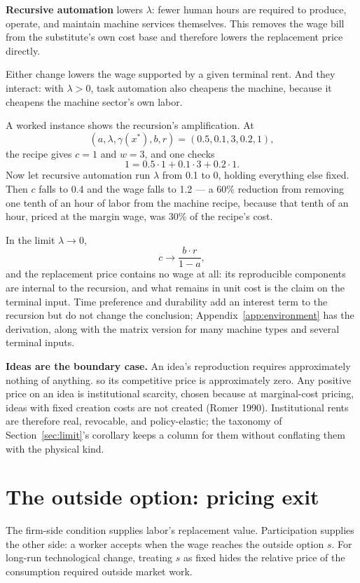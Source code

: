 \documentclass[12pt]{article}
\theoremstyle{plain}
\begin{document}
\textbf{Recursive automation} lowers $\lambda$: fewer human hours are required to
produce, operate, and maintain machine services themselves. This removes the wage
bill from the substitute's own cost base and therefore lowers the replacement
price directly. 

Either change lowers the wage supported by a given terminal rent. And they
interact: with $\lambda>0$, task automation also cheapens the machine, because it
cheapens the machine sector's own labor.

A worked instance shows the recursion's amplification. At
\[
(a,\lambda,\gamma(x^*),b,r)=(0.5,0.1,3,0.2,1),
\]
the recipe gives $c=1$ and $w=3$, and one checks
\[
1 = 0.5\cdot1 + 0.1\cdot3 + 0.2\cdot1.
\]
Now let recursive automation run $\lambda$ from 0.1 to 0, holding everything
else fixed. Then $c$ falls to 0.4 and the wage falls to 1.2 --- a 60\% reduction
from removing one tenth of an hour of labor from the machine recipe, because
that tenth of an hour, priced at the margin wage, was 30\% of the recipe's cost.

In the limit $\lambda\to0$,
\begin{equation}\label{eq:lambda-zero}
c \to \frac{b\cdot r}{1-a},
\end{equation}
and the replacement price contains no wage at all: its reproducible components
are internal to the recursion, and what remains in unit cost is the claim on the
terminal input. Time preference and durability add an interest term to the
recursion but do not change the conclusion; Appendix~\ref{app:environment} has
the derivation, along with the matrix version for many machine types and several
terminal inputs.

\textbf{Ideas are the boundary case.} An idea's reproduction requires
approximately nothing of anything. so its competitive price is approximately zero. Any positive
price on an idea is institutional scarcity, chosen because at marginal-cost
pricing, ideas with fixed creation costs are not created (Romer 1990).
Institutional rents are therefore real, revocable, and policy-elastic; the
taxonomy of Section~\ref{sec:limit}'s corollary keeps a column for them
without conflating them with the physical kind.

\section{The outside option: pricing exit}\label{sec:floor}

The firm-side condition supplies labor's replacement value. Participation supplies the other side: a worker accepts when the wage reaches the outside option $s$. For long-run technological change, treating $s$ as fixed hides the relative price of the consumption required outside market work.
\end{document}
